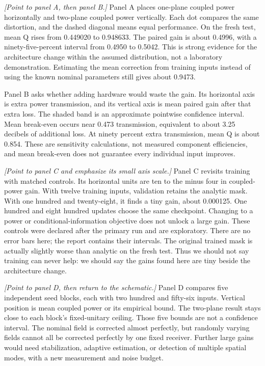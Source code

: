 \documentclass[11pt,letterpaper]{article}
\newcommand{\stage}[1]{\textit{[#1]}}
\begin{document}
\stage{Point to panel A, then panel B.}
Panel A places one-plane coupled power horizontally and two-plane coupled power vertically. Each dot compares the same distortion, and the dashed diagonal means equal performance. On the fresh test, mean Q rises from 0.449020 to 0.948633. The paired gain is about 0.4996, with a ninety-five-percent interval from 0.4950 to 0.5042. This is strong evidence for the architecture change within the assumed distribution, not a laboratory demonstration. Estimating the mean correction from training inputs instead of using the known nominal parameters still gives about 0.9473.

Panel B asks whether adding hardware would waste the gain. Its horizontal axis is extra power transmission, and its vertical axis is mean paired gain after that extra loss. The shaded band is an approximate pointwise confidence interval. Mean break-even occurs near 0.473 transmission, equivalent to about 3.25 decibels of additional loss. At ninety percent extra transmission, mean Q is about 0.854. These are sensitivity calculations, not measured component efficiencies, and mean break-even does not guarantee every individual input improves.

\stage{Point to panel C and emphasize its small axis scale.}
Panel C revisits training with matched controls. Its horizontal units are ten to the minus four in coupled-power gain. With twelve training inputs, validation retains the analytic mask. With one hundred and twenty-eight, it finds a tiny gain, about 0.000125. One hundred and eight hundred updates choose the same checkpoint. Changing to a power or conditional-information objective does not unlock a large gain. These controls were declared after the primary run and are exploratory. There are no error bars here; the report contains their intervals. The original trained mask is actually slightly worse than analytic on the fresh test. Thus we should not say training can never help: we should say the gains found here are tiny beside the architecture change.

\stage{Point to panel D, then return to the schematic.}
Panel D compares five independent seed blocks, each with two hundred and fifty-six inputs. Vertical position is mean coupled power or its empirical bound. The two-plane result stays close to each block's fixed-unitary ceiling. Those five bounds are not a confidence interval. The nominal field is corrected almost perfectly, but randomly varying fields cannot all be corrected perfectly by one fixed receiver. Further large gains would need stabilization, adaptive estimation, or detection of multiple spatial modes, with a new measurement and noise budget.
\end{document}
